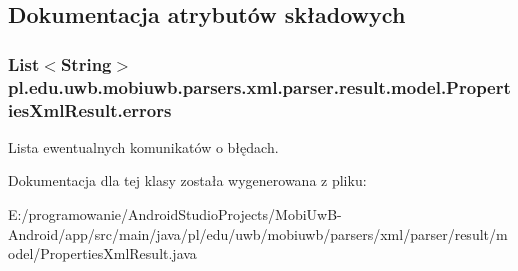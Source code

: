 \subsection{Dokumentacja atrybutów składowych}
\hypertarget{classpl_1_1edu_1_1uwb_1_1mobiuwb_1_1parsers_1_1xml_1_1parser_1_1result_1_1model_1_1_properties_xml_result_abe9d21ec89c02cfc6cbaf47818e5a3cc}{}
\subsubsection[{errors}]{\setlength{\rightskip}{0pt plus 5cm}List$<$String$>$ pl.\+edu.\+uwb.\+mobiuwb.\+parsers.\+xml.\+parser.\+result.\+model.\+Properties\+Xml\+Result.\+errors}\label{classpl_1_1edu_1_1uwb_1_1mobiuwb_1_1parsers_1_1xml_1_1parser_1_1result_1_1model_1_1_properties_xml_result_abe9d21ec89c02cfc6cbaf47818e5a3cc}
Lista ewentualnych komunikatów o błędach. 

Dokumentacja dla tej klasy została wygenerowana z pliku\+:\begin{DoxyCompactItemize}
\item 
E\+:/programowanie/\+Android\+Studio\+Projects/\+Mobi\+Uw\+B-\/\+Android/app/src/main/java/pl/edu/uwb/mobiuwb/parsers/xml/parser/result/model/Properties\+Xml\+Result.\+java\end{DoxyCompactItemize}
